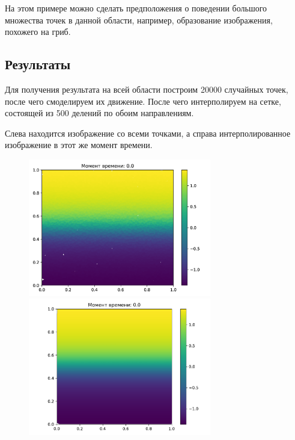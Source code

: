         На этом примере можно сделать предположения о поведении большого множества точек в данной области, например, образование изображения, похожего на гриб.


    \subsection{Результаты}
        Для получения результата на всей области построим 20000 случайных точек, после чего смоделируем их движение. После чего интерполируем на сетке, состоящей из 500 делений по обоим направлениям.

        Слева находится изображение со всеми точками, а справа интерполированное изображение в этот же момент времени.

    \begin{figure}[H]
        \centering
        \includegraphics[width=8cm]{pictures/s0.png}
        \includegraphics[width=8cm]{pictures/p0.pdf}
    \end{figure}
